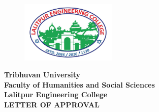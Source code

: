 

\begin{figure}
    \centering
    \includegraphics[width=1.8in]{img/Graphics/TUlogo.jpg
    }
\end{figure}

\begin{center}
    {\fontsize{14pt}{18}\selectfont
    \textbf{Tribhuvan University\\
    Faculty of Humanities and Social Sciences\\
    Lalitpur Engineering College\\
    \vspace{0.2in}
    LETTER OF APPROVAL\\}
    \vspace{0.2in}}
\end{center}


